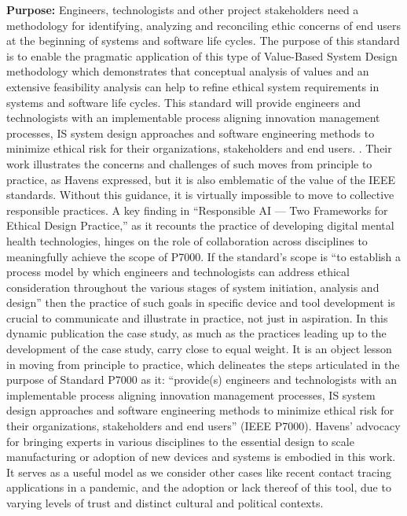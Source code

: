 \documentclass[11pt,dvipdfm]{article}
\begin{document}
{	\noindent \textbf{Purpose:}  Engineers, technologists and other project stakeholders need a methodology for identifying, analyzing and reconciling ethic concerns of end users at the beginning of systems and software life cycles.  The purpose of this standard is to enable the pragmatic application of this type of Value-Based System Design methodology which demonstrates that conceptual analysis of values and an extensive feasibility analysis can help to refine ethical system requirements in systems and software life cycles.  This standard will provide engineers and technologists with an implementable process aligning innovation management processes, IS system design approaches and software engineering methods to minimize ethical risk for their organizations, stakeholders and end users.  
}.  Their work illustrates the concerns and challenges of such moves from principle to practice, as Havens expressed, but it is also emblematic of the value of the IEEE standards.  Without this guidance, it is virtually impossible to move to collective responsible practices.  A key finding in ``Responsible AI –-- Two Frameworks for Ethical Design Practice,'' as it recounts the practice of developing digital mental health technologies, hinges on the role of collaboration across disciplines to meaningfully achieve the scope of P7000.  If the standard’s scope is “to establish a process model by which engineers and technologists can address ethical consideration throughout the various stages of system initiation, analysis and design” then the practice of such goals in specific device and tool development is crucial to communicate and illustrate in practice, not just in aspiration. In this dynamic publication the case study, as much as the practices leading up to the development of the case study, carry close to equal weight.  It is an object lesson in moving from principle to practice, which delineates the steps articulated in the purpose of Standard P7000 as it: ``provide(s) engineers and technologists with an implementable process aligning innovation management processes, IS system design approaches and software engineering methods to minimize ethical risk for their organizations, stakeholders and end users'' (IEEE P7000).  Havens’ advocacy for bringing experts in various disciplines to the essential design to scale manufacturing or adoption of new devices and systems is embodied in this work.  It serves as a useful model as we consider other cases like recent contact tracing applications in a pandemic, and the adoption or lack thereof of this tool, due to varying levels of trust and distinct cultural and political contexts.  
\end{document}
